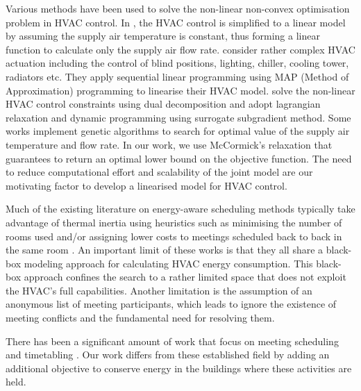 Various methods have been used to solve the non-linear non-convex optimisation problem in HVAC control. In \cite{klein2012coordinating}, the HVAC control is simplified to a linear model by assuming the supply air temperature is constant, thus forming a linear function to calculate only the supply air flow rate. \cite{oldewurtel2013importance} consider rather complex HVAC actuation including the control of blind positions, lighting, chiller, cooling tower, radiators etc. They apply sequential linear programming using MAP (Method of Approximation) programming \citep{griffith1961nonlinear} to linearise their HVAC model. \cite{ma2011distributed} solve the non-linear HVAC control constraints using dual decomposition and \cite{sun2010integrated} adopt lagrangian relaxation and dynamic programming using surrogate subgradient method. Some works \citep{wang2000model, xu2009model, mossolly2009optimal} implement genetic algorithms to search for optimal value of the supply air temperature and flow rate. In our work, we use McCormick's relaxation that guarantees to return an optimal lower bound on the objective function. The need to reduce computational effort and scalability of the joint model are our motivating factor to develop a linearised model for HVAC control. 

Much of the existing literature on energy-aware scheduling methods typically take advantage of thermal inertia using heuristics such as minimising the number of rooms used and/or assigning lower costs to meetings scheduled back to back in the same room \citep{pan2012thermal,kwak2013tesla,majumdar2012energy,chai2014minimizing}. An important limit of these works is that they all share a black-box modeling approach for calculating HVAC energy consumption. This black-box approach confines the search to a rather limited space that does not exploit the HVAC's full capabilities. Another limitation is the assumption of an anonymous list of meeting participants, which leads to ignore the existence of meeting conflicts and the fundamental need for resolving them. 

There has been a significant amount of work that focus on meeting scheduling \citep{modi2004multiagent,refanidis2010constraint,tran2016smart} and timetabling \citep{merlot2002hybrid,di2002multi,abdullah2007tabu}. Our work differs from these established field by adding an additional objective to conserve energy in the buildings where these activities are held. 

